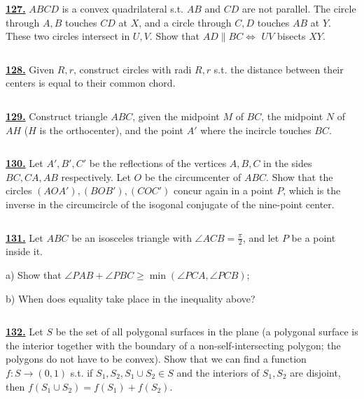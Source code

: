 \documentclass{article}
\begin{document}
$$ $$


\href{ http://www.artofproblemsolving.com/Forum/viewtopic.php?p=131325#p131325
}{\bf 127.} $ABCD$ is a convex quadrilateral s.t. $AB$ and $CD$ are not parallel. The circle through $A,B$ touches $CD$ at $X$, and a circle through $C,D$ touches $AB$ at $Y$. These two circles intersect in $U,V$. Show that $AD\|BC\iff$ $UV$ bisects $XY$.


$$ $$


\href{ http://www.artofproblemsolving.com/Forum/viewtopic.php?p=142514#p142514
}{\bf 128.} Given $R,r$, construct circles with radi $R,r$ s.t. the distance between their centers is equal to their common chord.


$$ $$


\href{ http://www.artofproblemsolving.com/Forum/viewtopic.php?p=142902#p142902
}{\bf 129.} Construct triangle $ABC$, given the midpoint $M$ of $BC$, the midpoint $N$ of $AH$ ($H$ is the orthocenter), and the point $A'$ where the incircle touches $BC$.


$$ $$


\href{ http://www.artofproblemsolving.com/Forum/viewtopic.php?p=157721#p157721
}{\bf 130.} Let $A',B',C'$ be the reflections of the vertices $A,B,C$ in the sides $BC,CA,AB$ respectively. Let $O$ be the circumcenter of $ABC$. Show that the circles $(AOA'),(BOB'),(COC')$ concur again in a point $P$, which is the inverse in the circumcircle of the isogonal conjugate of the nine-point center.


$$ $$


\href{ http://www.artofproblemsolving.com/Forum/viewtopic.php?p=159507#p159507
}{\bf 131.} Let $ABC$ be an isosceles triangle with $\angle ACB=\frac\pi 2$, and let $P$ be a point inside it.

a) Show that $\angle PAB+\angle PBC\ge\min(\angle PCA,\angle PCB)$;

b) When does equality take place in the inequality above?


$$ $$


\href{ http://www.artofproblemsolving.com/Forum/viewtopic.php?p=189522#p189522
}{\bf 132.} Let $S$ be the set of all polygonal surfaces in the plane (a polygonal surface is the interior together with the boundary of a non-self-intersecting polygon; the polygons do not have to be convex). Show that we can find a function $f:S\to (0,1)$ s.t. if $S_1,S_2,S_1\cup S_2\in S$ and the interiors of $S_1,S_2$ are disjoint, then $f(S_1\cup S_2)=f(S_1)+f(S_2)$.


$$ $$
\end{document}
